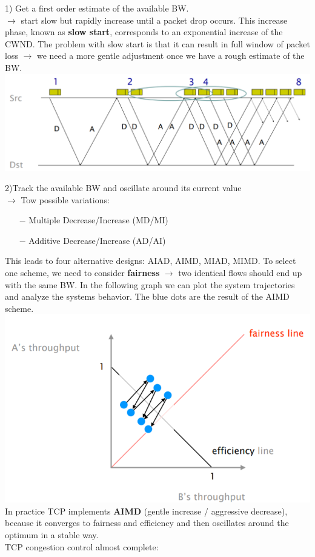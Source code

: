 \documentclass[a4paper, fontsize=8pt, landscape, DIV=1]{scrartcl}
\begin{document}
\begin{multicols*}{4}
		1) Get a first order estimate of the available BW.\\
		$\rightarrow$ start slow but rapidly increase until a packet drop occurs. This
		increase phase, known as \textbf{slow start}, corresponds to an exponential
		increase of the CWND. The problem with slow start is that it can result in full
		window of packet loss $\rightarrow$ we need a more gentle adjustment once we
		have a rough estimate of the BW.\\ 
		\includegraphics[width=\columnwidth]{images/Transport_Layer/slow_start.png}
		\par 
		
		2)Track the available BW and oscillate around its current value\\
		$\rightarrow$ Tow possible variations: 
		\begin{itemize}[noitemsep]
			\item[$-$] Multiple Decrease/Increase (MD/MI)
			\item[$-$] Additive Decrease/Increase (AD/AI)
		\end{itemize} 
		This leads to four alternative designs: AIAD, AIMD, MIAD, MIMD. To select one
		scheme, we need to consider \textbf{fairness} $\rightarrow$ two identical flows
		should end up with the same BW. In the following graph we can plot the system
		trajectories and analyze the systems behavior. The blue dots are the result of
		the AIMD scheme.\\
		
		\includegraphics[width=\columnwidth]{images/Transport_Layer/trajectory_plot.png}
		In practice TCP implements \textbf{AIMD} (gentle increase / aggressive
		decrease), because it converges to fairness and efficiency and then oscillates
		around the optimum in a stable way.\\
		TCP congestion control almost complete:
		\vspace{0.1cm}
		\begin{center}
			

\end{center}
\end{multicols*}
\end{document}
